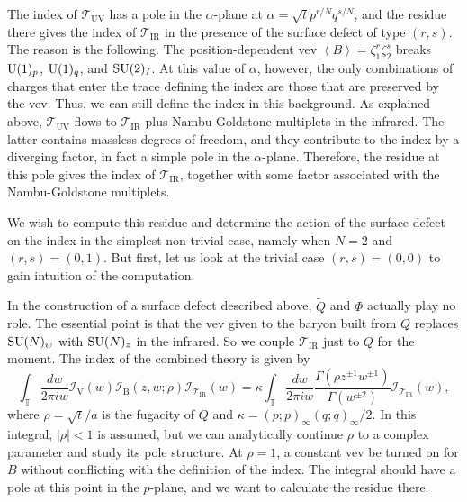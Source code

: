 The index of $\mathcal{T}_{\mathrm{UV}}$ has a pole in the $\alpha$-plane
at $\alpha=\sqrt{t}p^{r/N}q^{s/N}$, and the residue there gives the
index of $\mathcal{T}_{\mathrm{IR}}$ in the presence of the surface
defect of type $(r,s)$. The reason is the following. The position-dependent
vev $\left\langle B\right\rangle =\zeta_{1}^{r}\zeta_{2}^{s}$ breaks
$\mathrm{U}(1)_{p}$, $\mathrm{U}(1)_{q}$, and $\mathrm{SU}(2)_{I}$. At this value of $\alpha$,
however, the only combinations of charges that enter the trace defining
the index are those that are preserved by the vev. Thus, we can still
define the index in this background. As explained above, $\mathcal{T}_{\mathrm{UV}}$
flows to $\mathcal{T}_{\mathrm{IR}}$ plus Nambu-Goldstone multiplets
in the infrared. The latter contains massless degrees of freedom,
and they contribute to the index by a diverging factor, in fact a
simple pole in the $\alpha$-plane. Therefore, the residue at this
pole gives the index of $\mathcal{T}_{\mathrm{IR}}$, together with
some factor associated with the Nambu-Goldstone multiplets.

We wish to compute this residue and determine the action of the surface
defect on the index in the simplest non-trivial case, namely when
$N=2$ and $(r,s)=(0,1)$. But first, let us look at the trivial case
$(r,s)=(0,0)$ to gain intuition of the computation.

In the construction of a surface defect described above, $\tilde{Q}$
and $\Phi$ actually play no role. The essential point is that the
vev given to the baryon built from $Q$ replaces $\mathrm{SU}(N)_{w}$ with
$\mathrm{SU}(N)_{z}$ in the infrared. So we couple $\mathcal{T}_{\mathrm{IR}}$
just to $Q$ for the moment. The index of the combined theory is given
by
\begin{equation}
    \int_{\mathbb{T}}\frac{dw}{2\pi iw}
    \mathcal{I}_{\mathrm{V}}(w)
    \mathcal{I}_{\mathrm{B}}(z,w;\rho)
    \mathcal{I}_{\mathcal{T}_{\mathrm{IR}}}(w)
      =
        \kappa  \int_{\mathbb{T}}\frac{dw}{2\pi iw}
        \frac{\Gamma(\rho z^{\pm1}w^{\pm1})}{\Gamma(w^{\pm2})}
        \mathcal{I}_{\mathcal{T}_{\mathrm{IR}}}(w),
\end{equation}
where $\rho=\sqrt{t}/a$ is the fugacity of $Q$ and $\kappa=(p;p)_{\infty}(q;q)_{\infty}/2$.
In this integral, $|\rho|<1$ is assumed, but we can analytically
continue $\rho$ to a complex parameter and study its pole structure.
At $\rho=1$, a constant vev be turned on for $B$ without conflicting
with the definition of the index. The integral should have a pole
at this point in the $p$-plane, and we want to calculate the residue
there.

